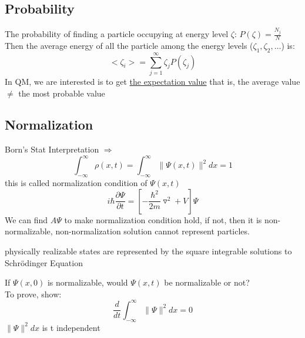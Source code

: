 \documentclass[12pt, a4paper]{article}
\begin{document}
\subsection{Probability}
The probability of finding a particle occupying at energy level $\zeta$: $P(\zeta)= \frac{N_j}{N}$\\
Then the average energy of all the particle among the energy levels ($\zeta_1, \zeta_2,\hdots$) is: $$<\zeta_i>=\sum_{j=1}^\infty \zeta_j P(\zeta_j)$$
In QM, we are interested is to get \underline{the expectation value} that is, the average value $\not =$ the most probable value

\subsection{Normalization}
Born's Stat Interpretation $\Rightarrow$ $$\int_{-\infty}^{\infty}\rho(x,t)=\int_{-\infty}^{\infty}\|\Psi(x,t)\|^2dx=1$$
this is called normalization condition of $\Psi(x,t)$
$$i\hbar \frac{\partial \Psi}{\partial t}=\left[ -\frac{\hbar^2}{2m}\triangledown^2+V \right]\Psi$$
We can find $A\Psi$ to make normalization condition hold, if not, then it is non-normalizable, non-normalization solution cannot represent particles.

physically realizable states are represented by the square integrable solutions to Schr\"odinger Equation

If $\Psi(x,0)$ is normalizable, would $\Psi(x,t)$ be normalizable or not? \\ To prove, show: $$\frac{d}{dt}\int_{-\infty}^{\infty}\|\Psi\|^2dx=0$$
$\|\Psi\|^2dx$ is t independent
\end{document}
